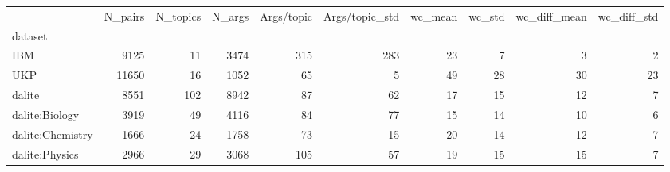 \begin{tabular}{lrrrrrrrrr}
\toprule
{} &  N\_pairs &  N\_topics &  N\_args &  Args/topic &  Args/topic\_std &  wc\_mean &  wc\_std &  wc\_diff\_mean &  wc\_diff\_std \\
dataset          &          &           &         &             &                 &          &         &               &              \\
\midrule
IBM              &     9125 &        11 &    3474 &         315 &             283 &       23 &       7 &             3 &            2 \\
UKP              &    11650 &        16 &    1052 &          65 &               5 &       49 &      28 &            30 &           23 \\
dalite           &     8551 &       102 &    8942 &          87 &              62 &       17 &      15 &            12 &            7 \\
dalite:Biology   &     3919 &        49 &    4116 &          84 &              77 &       15 &      14 &            10 &            6 \\
dalite:Chemistry &     1666 &        24 &    1758 &          73 &              15 &       20 &      14 &            12 &            7 \\
dalite:Physics   &     2966 &        29 &    3068 &         105 &              57 &       19 &      15 &            15 &            7 \\
\bottomrule
\end{tabular}
